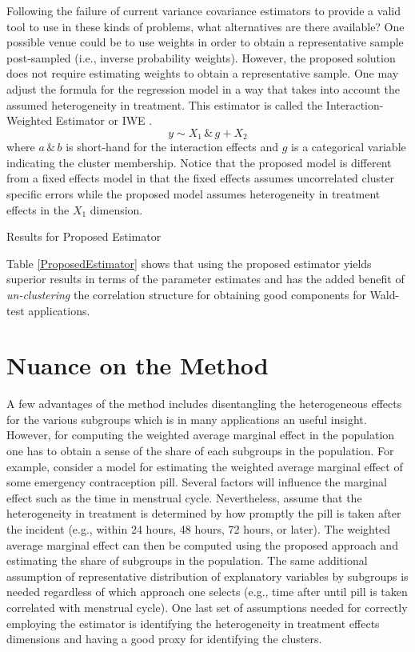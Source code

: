 \documentclass{jbsc}
\begin{document}
Following the failure of current variance covariance estimators to provide a valid tool to use in these kinds of problems, what alternatives are there available? One possible venue could be to use weights in order to obtain a representative sample post-sampled (i.e., inverse probability weights). However, the proposed solution does not require estimating weights to obtain a representative sample. One may adjust the formula for the regression model in a way that takes into account the assumed heterogeneity in treatment. This estimator is called the Interaction-Weighted Estimator or IWE \citep{Gibbons_SúarezSerrato_Urbancic_2018}.
\begin{equation}
y \sim X_{1}\,\&\,g + X_{2}
\end{equation}
where $a\,\&\,b$ is short-hand for the interaction effects and $g$ is a categorical variable indicating the cluster membership. Notice that the proposed model is different from a fixed effects model in that the fixed effects assumes uncorrelated cluster specific errors while the proposed model assumes heterogeneity in treatment effects in the $X_{1}$ dimension.

\begin{table}[hbpt]
	\centering
	\caption{Results for Proposed Estimator}
	\label{ProposedEstimator}
	
\end{table}

Table \ref{ProposedEstimator} shows that using the proposed estimator yields superior results in terms of the parameter estimates and has the added benefit of \textit{un-clustering} the correlation structure for obtaining good components for Wald-test applications.

\section{Nuance on the Method}

A few advantages of the method includes disentangling the heterogeneous effects for the various subgroups which is in many applications an useful insight. However, for computing the weighted average marginal effect in the population one has to obtain a sense of the share of each subgroups in the population. For example, consider a model for estimating the weighted average marginal effect of some emergency contraception pill. Several factors will influence the marginal effect such as the time in menstrual cycle. Nevertheless, assume that the heterogeneity in treatment is determined by how promptly the pill is taken after the incident (e.g., within 24 hours, 48 hours, 72 hours, or later). The weighted average marginal effect can then be computed using the proposed approach and estimating the share of subgroups in the population. The same additional assumption of representative distribution of explanatory variables by subgroups is needed regardless of which approach one selects (e.g., time after until pill is taken correlated with menstrual cycle). One last set of assumptions needed for correctly employing the estimator is identifying the heterogeneity in treatment effects dimensions and having a good proxy for identifying the clusters.
\end{document}
